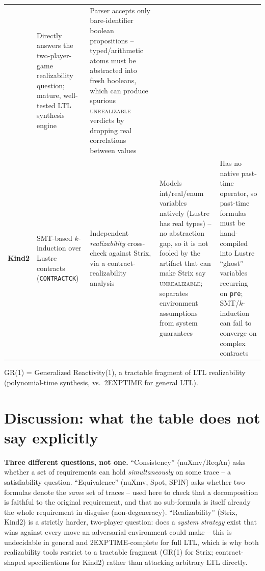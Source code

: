 \documentclass[11pt]{article}
\begin{document}
\begin{table}[htbp]
\begin{threeparttable}
\begin{tabularx}{\textwidth}{@{} l l >{\raggedright\arraybackslash}X >{\raggedright\arraybackslash}X >{\raggedright\arraybackslash}X @{}}
  & Directly answers the two-player-game realizability question; mature, well-tested LTL synthesis engine
  & Parser accepts only bare-identifier boolean propositions -- typed/arithmetic atoms must be abstracted into fresh booleans, which can produce spurious \textsc{unrealizable} verdicts by dropping real correlations between values \\
\textbf{Kind2}
  & SMT-based $k$-induction over Lustre contracts (\texttt{CONTRACTCK})
  & Independent \emph{realizability} cross-check against Strix, via a contract-realizability analysis
  & Models int/real/enum variables natively (Lustre has real types) -- no abstraction gap, so it is not fooled by the artifact that can make Strix say \textsc{unrealizable}; separates environment assumptions from system guarantees
  & Has no native past-time operator, so past-time formulas must be hand-compiled into Lustre ``ghost'' variables recurring on \texttt{pre}; SMT/$k$-induction can fail to converge on complex contracts \\
\bottomrule
\end{tabularx}
\begin{tablenotes}
\footnotesize
\item GR(1) = Generalized Reactivity(1), a tractable fragment of LTL realizability (polynomial-time synthesis, vs.\ 2EXPTIME for general LTL).
\end{tablenotes}
\end{threeparttable}
\end{table}

\section{Discussion: what the table does not say explicitly}
\label{sec:discussion}

\textbf{Three different questions, not one.} ``Consistency'' (nuXmv/ReqAn) asks whether a set
of requirements can hold \emph{simultaneously} on some trace -- a satisfiability question.
``Equivalence'' (nuXmv, Spot, SPIN) asks whether two formulas denote the \emph{same} set of
traces -- used here to check that a decomposition is faithful to the original requirement, and
that no sub-formula is itself already the whole requirement in disguise (non-degeneracy).
``Realizability'' (Strix, Kind2) is a strictly harder, two-player question: does a
\emph{system strategy} exist that wins against every move an adversarial environment could
make -- this is undecidable in general and 2EXPTIME-complete for full LTL, which is why both
realizability tools restrict to a tractable fragment (GR(1) for Strix; contract-shaped
specifications for Kind2) rather than attacking arbitrary LTL directly.
\end{document}
